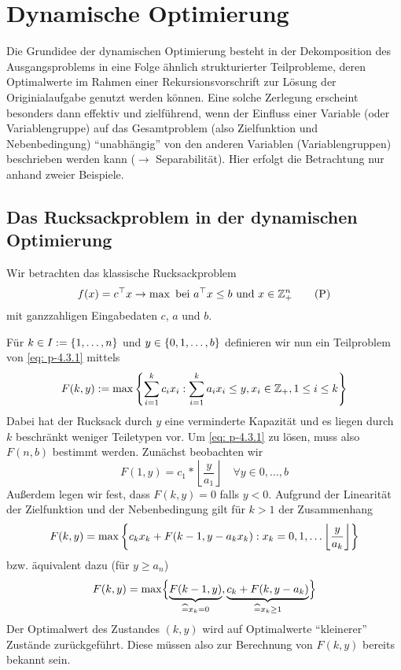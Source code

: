 \section{Dynamische Optimierung}

Die Grundidee der dynamischen Optimierung  besteht in der Dekomposition des Ausgangsproblems in eine Folge ähnlich strukturierter Teilprobleme, deren Optimalwerte im Rahmen einer Rekursionsvorschrift zur Lösung der Originialaufgabe genutzt werden können. Eine solche Zerlegung erscheint besonders dann effektiv und zielführend, wenn der Einfluss einer Variable (oder Variablengruppe) auf das Gesamtproblem (also Zielfunktion und Nebenbedingung) \enquote{unabhängig} von den anderen Variablen (Variablengruppen) beschrieben werden kann ($\to$ Separabilität). Hier erfolgt die Betrachtung nur anhand zweier Beispiele.

\subsection{Das Rucksackproblem in der dynamischen Optimierung}
Wir betrachten das klassische Rucksackproblem
\begin{equation*}
	f(x) = c^{\top} x \to \max \text{ bei } a^{\top}x \le b \text{ und } x \in \mathbb{Z}_+^n \tag{P} \label{eq: p-4.3.1}
\end{equation*}
mit ganzzahligen Eingabedaten $c$, $a$ und $b$.

Für $k \in I \mathrel{:=} \left\{ 1, \dots, n \right\}$ und $y \in \left\{ 0,1,\dots, b \right\}$ definieren wir nun ein Teilproblem von \eqref{eq: p-4.3.1} mittels
\begin{equation*}
	F(k,y) \mathrel{:=} \max\left\{ \sum_{i=1}^k c_i x_i : \sum_{i=1}^k a_i x_i \le y, x_i \in \mathbb{Z}_+, 1 \le i \le k \right\}
\end{equation*}
Dabei hat der Rucksack durch $y$ eine verminderte Kapazität und es liegen durch $k$ beschränkt weniger Teiletypen vor.
Um \eqref{eq: p-4.3.1} zu lösen, muss also $F(n,b)$ bestimmt werden.
Zunächst beobachten wir
\begin{equation*}
	F(1,y) = c_1 * \left\lfloor \frac{y}{a_1} \right\rfloor \quad \forall y \in {0, \dots, b}
\end{equation*}
Außerdem legen wir fest, dass $F(k,y) = 0$ falls $y < 0$.
Aufgrund der Linearität der Zielfunktion und der Nebenbedingung gilt für $k > 1$ der Zusammenhang
\begin{equation*}
	F(k,y) = \max\left\{ c_k x_k + F(k-1, y-a_k x_k): x_k = 0,1,\dots \left\lfloor \frac{y}{a_k} \right\rfloor \right\}
\end{equation*}
bzw. äquivalent dazu (für $y \ge a_n$)
\begin{equation}
	F(k,y) = \max \Bigl\{  \underbrace{F(k-1,y)}_{\widehat{=} x_k = 0}, \underbrace{c_k + F(k,y-a_k)}_{\widehat{=} x_k \ge 1} \Bigr\}
	\label{eq: 4.6}
\end{equation}
Der Optimalwert des Zustandes $(k,y)$ wird auf Optimalwerte \enquote{kleinerer} Zustände zurückgeführt. Diese müssen also zur Berechnung von $F(k,y)$ bereits bekannt sein.

